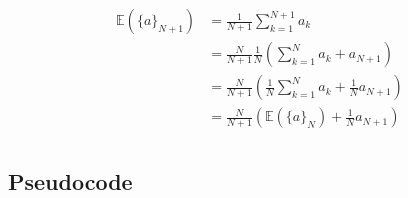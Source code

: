\documentclass{scrartcl}
\newcommand{\expect}{\mathbb{E}}
\newcommand{\remark}[1]{\begin{center}\fcolorbox{black}{yellow}{\parbox{.8\textwidth}{#1}}\end{center}}
\begin{document}
\begin{align*}
  \expect(\{a\}_{N+1}) &= \frac{1}{N+1}  \sum_{k=1}^{N+1} a_k \\
    &= \frac{N}{N+1} \frac{1}{N} \left ( \sum_{k=1}^{N} a_k + a_{N+1}\right )\\
    &= \frac{N}{N+1} \left ( \frac{1}{N}\sum_{k=1}^{N} a_k + \frac{1}{N} a_{N+1}\right )\\
    &= \frac{N}{N+1} \left ( \expect(\{a\}_{N}) + \frac{1}{N} a_{N+1}\right )\\
\end{align*}

\subsection{Pseudocode}

\fbox{\parbox{\textwidth}{\scriptsize }}




\end{document}
